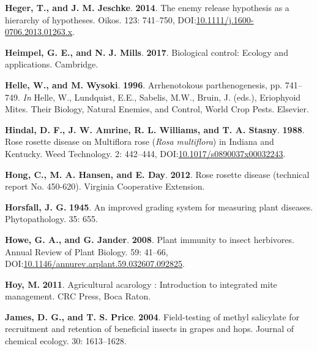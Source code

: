 \documentclass[12pt,final,CPage]{ufthesis}
\newlength{\cslhangindent}
\newenvironment{CSLReferences}[2] %
{%
	\setlength{\parindent}{0pt}
	\ifodd #1 \everypar{\setlength{\hangindent}{\cslhangindent}}\ignorespaces\fi
	\ifnum #2 > 0
	\setlength{\parskip}{#2\baselineskip}
	\fi
}%
{}
\begin{document}
{\begin{CSLReferences}{1}{0}
  \leavevmode{}%
  \textbf{Heger, T., and J. M. Jeschke}. \textbf{2014}. The enemy release hypothesis as a hierarchy of hypotheses. Oikos. 123: 741--750, DOI:\href{https://doi.org/10.1111/j.1600-0706.2013.01263.x}{10.1111/j.1600-0706.2013.01263.x}.

  \leavevmode{}%
  \textbf{Heimpel, G. E., and N. J. Mills}. \textbf{2017}. Biological control: Ecology and applications. Cambridge.

  \leavevmode{}%
  \textbf{Helle, W., and M. Wysoki}. \textbf{1996}. Arrhenotokous parthenogenesis, pp. 741--749. \emph{In} Helle, W., Lundquist, E.E., Sabelis, M.W., Bruin, J. (eds.), Eriophyoid Mites. Their Biology, Natural Enemies, and Control, World Crop Pests. Elsevier.

  \leavevmode{}%
  \textbf{Hindal, D. F., J. W. Amrine, R. L. Williams, and T. A. Stasny}. \textbf{1988}. {Rose rosette disease} on {Multiflora rose} ({\emph{Rosa multiflora}}) in {Indiana} and {Kentucky}. Weed Technology. 2: 442--444, DOI:\href{https://doi.org/10.1017/s0890037x00032243}{10.1017/s0890037x00032243}.

  \leavevmode{}%
  \textbf{Hong, C., M. A. Hansen, and E. Day}. \textbf{2012}. {Rose rosette disease} (technical report No. 450-620). Virginia Cooperative Extension.

  \leavevmode{}%
  \textbf{Horsfall, J. G.} \textbf{1945}. An improved grading system for measuring plant diseases. Phytopathology. 35: 655.

  \leavevmode{}%
  \textbf{Howe, G. A., and G. Jander}. \textbf{2008}. Plant immunity to insect herbivores. Annual Review of Plant Biology. 59: 41--66, DOI:\href{https://doi.org/10.1146/annurev.arplant.59.032607.092825}{10.1146/annurev.arplant.59.032607.092825}.

  \leavevmode{}%
  \textbf{Hoy, M.} \textbf{2011}. Agricultural acarology : Introduction to integrated mite management. CRC Press, Boca Raton.

  \leavevmode{}%
  \textbf{James, D. G., and T. S. Price}. \textbf{2004}. Field-testing of methyl salicylate for recruitment and retention of beneficial insects in grapes and hops. Journal of chemical ecology. 30: 1613--1628.


\end{CSLReferences}}
\end{document}
